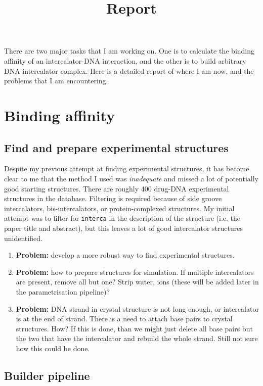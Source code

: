 \documentclass{article}
\title{Report}
\begin{document}
\maketitle

There are two major tasks that I am working on. One is to calculate the binding affinity of an intercalator-DNA interaction, and the other is to build arbitrary DNA intercalator complex. Here is a detailed report of where I am now, and the problems that I am encountering.

\section{Binding affinity}

\subsection{Find and prepare experimental structures}

Despite my previous attempt at finding experimental structures, it has become clear to me that the method I used was \emph{inadequate} and missed a lot of potentially good starting structures. There are roughly 400 drug-DNA  experimental structures in the database. Filtering is required because of side groove intercalators, bis-intercalators, or protein-complexed structures. My initial attempt was to filter for \texttt{interca} in the description of the structure (i.e. the paper title and abstract), but this leaves a lot of good intercalator structures unidentified.

\begin{enumerate}
  \item \textbf{Problem:} develop a more robust way to find experimental structures.
  \item \textbf{Problem:} how to prepare structures for simulation. If multiple intercalators are present, remove all but one? Strip water, ions (these will be added later in the parametrisation pipeline)?
  \item \textbf{Problem:} DNA strand in crystal structure is not long enough, or intercalator is at the end of strand. There is a need to attach base pairs to crystal structures. How? If this is done, than we might just delete all base pairs but the two that have the intercalator and rebuild the whole strand. Still not sure how this could be done.
\end{enumerate}

\subsection{Builder pipeline}
\end{document}
